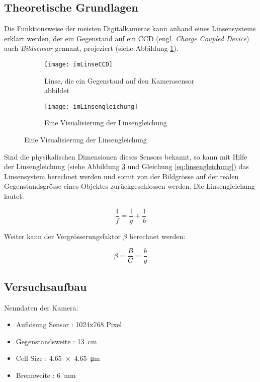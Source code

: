 \subsection{Theoretische Grundlagen}

Die Funktionsweise  der meisten Digitalkameras kann anhand eines Linsensystems
erkl\"art werden, der ein Gegenstand auf ein CCD (engl. \textit{Charge Coupled
Device})  auch  \textit{Bildsensor}  gennant,  projeziert   (siehe   Abbildung
\ref{fig:linseccd}).

\begin{figure}[h!]
    \centering
    \begin{subfigure}[b]{.45\linewidth}
        \texttt{[image: imLinseCCD]}
        \caption{Linse, die ein Gegenstand auf den Kamerasensor abbildet \cite{ref:perfektfokusiert}}
        \label{fig:linseccd}
    \end{subfigure}
    \begin{subfigure}[b]{.45\linewidth}
        \texttt{[image: imLinsengleichung]}
        \caption{Eine Visualisierung der Linsengleichung \cite{ref:Linsengleichung}}
        \label{fig:linsengleichung}
    \end{subfigure}
\end{figure}

Sind die physikalischen Dimensionen  dieses Sensors bekannt, so kann mit Hilfe
der Linsengleichung  (siehe  Abbildung \ref{fig:linsengleichung} und Gleichung
\ref{eq:linsengleichung}) das Linsensystem berechnet werden und somit von  der
Bildgr\"osse    auf    der    realen    Gegenstandsgr\"osse   eines   Objektes
zur\"uckgeschlossen werden. Die Linsengleichung lautet:

\begin{equation}
    \frac{1}{f} = \frac{1}{g} + \frac{1}{b}
    \label{eq:linsengleichung}
\end{equation}

Weiter kann der Vergr\"osserungsfaktor $\beta$ berechnet werden:

\begin{equation}
    \beta = \frac{B}{G} = \frac{b}{g}
\end{equation}


\subsection{Versuchsaufbau}

Nenndaten der Kamera:
    
\begin{itemize}
    \item Aufl\"osung Sensor : 1024x768 Pixel
    \item Gegenstandsweite : \SI{13}{\centi\meter}
    \item Cell Size : \SI{4.65 x 4.65}{\micro\meter}
    \item Brennweite : \SI {6}{\milli\meter}
\end{itemize}

